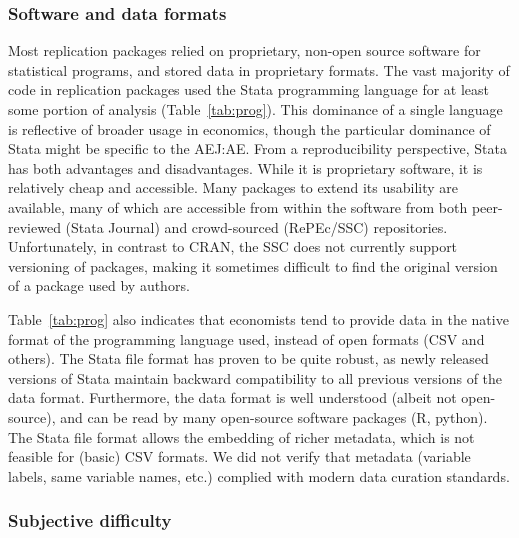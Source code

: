 \subsubsection{Software and data formats} 


Most replication packages relied on proprietary, non-open source software for statistical programs, and stored data in proprietary formats. The vast majority of code in replication packages used the Stata programming language for at least some portion of analysis (Table~\ref{tab:prog}). This dominance of a single language is reflective of broader usage in economics, though the particular dominance of Stata might be specific to the \ac{AEJ:AE}. From a reproducibility perspective, Stata has both advantages and disadvantages. While it is proprietary software, it is relatively cheap and accessible. Many packages to extend its usability are available, many of which are accessible from within the software from both peer-reviewed (Stata Journal) and crowd-sourced (RePEc/SSC) repositories. Unfortunately, in contrast to CRAN, the SSC does not currently support versioning of packages, making it sometimes difficult to find the original version of a package used by authors. 




Table~\ref{tab:prog} also indicates that economists tend to provide data in the native format of the programming language used, instead of open formats (CSV and others). The Stata file format has proven to be quite robust, as newly released versions of Stata maintain backward compatibility to all previous versions of the data format. Furthermore,  the data format is well understood (albeit not open-source), and can be read by many open-source software packages (R, python). The Stata file format allows the embedding of richer metadata, which is not feasible for (basic) CSV formats. We did not verify that metadata (variable labels, same variable names, etc.) complied with modern data curation standards.

\FloatBarrier



\subsubsection{Subjective difficulty}

